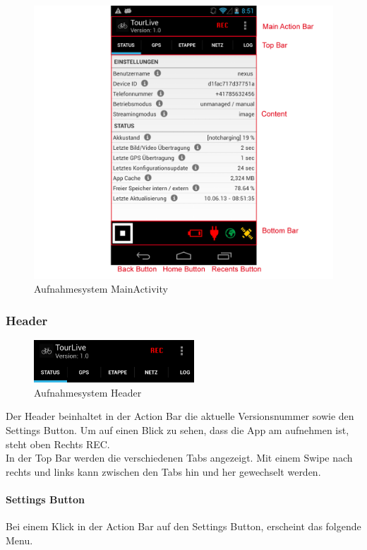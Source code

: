 \begin{figure}[H]
	\centering
	\includegraphics[width=120mm]{images/android/status.png}
	\caption{Aufnahmesystem MainActivity}
\end{figure}


\subsubsection{Header}
\begin{figure}[H]
	\centering
	\includegraphics[width=60mm]{images/android/header.png}
	\caption{Aufnahmesystem Header}
\end{figure}
Der Header beinhaltet in der Action Bar die aktuelle Versionsnummer sowie den Settings Button. Um auf einen Blick zu sehen, dass die App am aufnehmen ist, steht oben Rechts REC. \\
In der Top Bar werden die verschiedenen Tabs angezeigt. Mit einem Swipe nach rechts und links kann zwischen den Tabs hin und her gewechselt werden.

\paragraph{Settings Button}
Bei einem Klick in der Action Bar auf den Settings Button, erscheint das folgende Menu.

